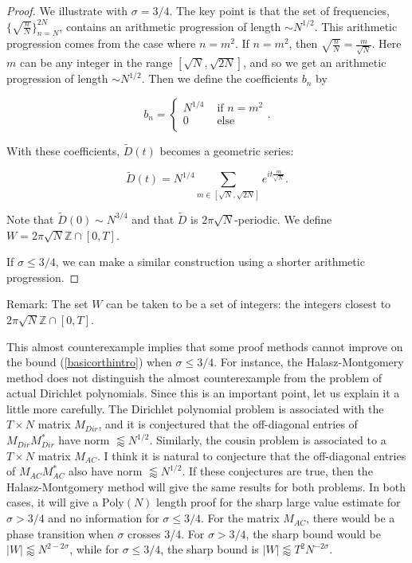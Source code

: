 \documentclass{amsart}
\newcommand{\Poly}{\textrm{Poly}}
\newcommand{\ZZ}{\mathbb{Z}}
\begin{document}
\begin{proof} We illustrate with $\sigma = 3/4$.  The key point is that the set of frequencies, $\{ \sqrt{ \frac{n}{N}} \}_{n=N}^{2N}$, contains an arithmetic progression of length $\sim N^{1/2}$.  This arithmetic progression comes from the case where $n = m^2$.  If $n = m^2$, then $\sqrt{ \frac{n}{N}} = \frac{m}{\sqrt{N}}$.  Here $m$ can be any integer in the range $[\sqrt{N}, \sqrt{2N}]$, and so we get an arithmetic progression of length $\sim N^{1/2}$.  Then we define the coefficients $b_n$ by

$$ b_n = \begin{cases}  N^{1/4} & \textrm{ if } n = m^2 \\ 0 & \textrm{ else } \\                        \end{cases}. $$

\noindent With these coefficients, $\tilde D(t)$ becomes a geometric series:

$$ \tilde D(t) = N^{1/4} \sum_{m \in [\sqrt{N}, \sqrt{2N}]} e^{i t \frac{m}{\sqrt{N}}}. $$

Note that $\tilde D(0) \sim N^{3/4}$ and that $\tilde D$ is $2 \pi \sqrt{N}$-periodic.  We define $W = 2 \pi \sqrt{N} \ZZ \cap [0, T]$.  

If $\sigma \le 3/4$, we can make a similar construction using a shorter arithmetic progression.

\end{proof}

Remark: The set $W$ can be taken to be a set of integers: the integers closest to $2 \pi \sqrt{N} \ZZ \cap [0,T]$.  

This almost counterexample implies that some proof methods cannot improve on the bound (\ref{basicorthintro}) when $\sigma \le 3/4$.   For instance,  the Halasz-Montgomery method does not distinguish the almost counterexample from the problem of actual Dirichlet polynomials.  Since this is an important point,  let us explain it a little more carefully.   The Dirichlet polynomial problem is associated with the $T \times N$ matrix $M_{Dir}$,  and it is conjectured that the off-diagonal entries of $M_{Dir} M_{Dir}^*$ have norm $\lessapprox N^{1/2}$.   Similarly,  the cousin problem is associated to a $T \times N$ matrix $M_{AC}$.   I think it is natural to conjecture that the off-diagonal entries of $M_{AC} M_{AC}^*$ also have norm $\lessapprox N^{1/2}$.   If these conjectures are true,  then the Halasz-Montgomery method will give the same results for both problems.   In both cases,  it will give a $\Poly(N)$ length proof for the sharp large value estimate for $\sigma > 3/4$ and no information for $\sigma \le 3/4$.    For the matrix $M_{AC}$,  there would be a phase transition when $\sigma$ crosses 3/4.   For $\sigma > 3/4$,  the sharp bound would be $|W| \lessapprox N^{2 - 2 \sigma}$,  while for $\sigma \le 3/4$,  the sharp bound is $|W| \lessapprox T^2 N^{-2 \sigma}$.   
\end{document}
